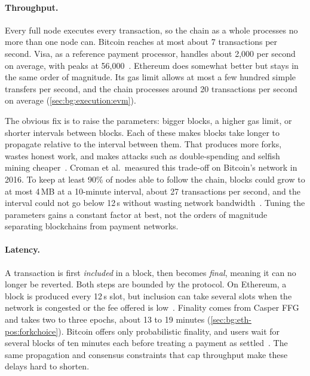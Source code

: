 \paragraph{Throughput.}
Every full node executes every transaction, so the chain as a whole processes no more than one node can.
Bitcoin reaches at most about 7 transactions per second.
Visa, as a reference payment processor, handles about 2{,}000 per second on average, with peaks at 56{,}000~\cite{croman2016scaling}.
Ethereum does somewhat better but stays in the same order of magnitude.
Its gas limit allows at most a few hundred simple transfers per second, and the chain processes around 20 transactions per second on average (\autoref{sec:bg:execution:evm}).

The obvious fix is to raise the parameters: bigger blocks, a higher gas limit, or shorter intervals between blocks.
Each of these makes blocks take longer to propagate relative to the interval between them.
That produces more forks, wastes honest work, and makes attacks such as double-spending and selfish mining cheaper~\cite{gervais2016security}.
Croman et al.\ measured this trade-off on Bitcoin's network in 2016.
To keep at least 90\% of nodes able to follow the chain, blocks could grow to at most 4\,MB at a 10-minute interval, about 27 transactions per second, and the interval could not go below 12\,s without wasting network bandwidth~\cite{croman2016scaling}.
Tuning the parameters gains a constant factor at best, not the orders of magnitude separating blockchains from payment networks.

\paragraph{Latency.}
A transaction is first \emph{included} in a block, then becomes \emph{final}, meaning it can no longer be reverted.
Both steps are bounded by the protocol.
On Ethereum, a block is produced every 12\,s slot, but inclusion can take several slots when the network is congested or the fee offered is low~\cite{pacheco2023my}. 
Finality comes from Casper FFG and takes two to three epochs, about 13 to 19 minutes (\autoref{sec:bg:eth-pos:forkchoice}).
Bitcoin offers only probabilistic finality, and users wait for several blocks of ten minutes each before treating a payment as settled~\cite{nakamoto2008bitcoin}. 
The same propagation and consensus constraints that cap throughput make these delays hard to shorten.

